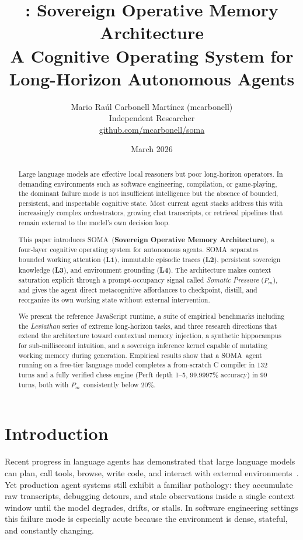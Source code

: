 \documentclass[11pt,a4paper]{article}
\title{\soma: Sovereign Operative Memory Architecture\\
\large A Cognitive Operating System for Long-Horizon Autonomous Agents}
\author{
Mario Ra\'{u}l Carbonell Mart\'{i}nez (mcarbonell)\\
\small Independent Researcher\\
\small \url{github.com/mcarbonell/soma}
}
\date{March 2026}
\newcommand{\soma}{\textsc{SOMA}}
\newcommand{\Pm}{\ensuremath{P_m}}
\begin{document}
\maketitle

\begin{abstract}
Large language models are effective local reasoners but poor long-horizon operators.
In demanding environments such as software engineering, compilation, or game-playing,
the dominant failure mode is not insufficient intelligence but the absence of bounded,
persistent, and inspectable cognitive state. Most current agent stacks address this
with increasingly complex orchestrators, growing chat transcripts, or retrieval
pipelines that remain external to the model's own decision loop.

This paper introduces \soma\ (\textbf{Sovereign Operative Memory Architecture}),
a four-layer cognitive operating system for autonomous agents.
\soma\ separates bounded working attention (\textbf{L1}), immutable episodic traces
(\textbf{L2}), persistent sovereign knowledge (\textbf{L3}), and environment
grounding (\textbf{L4}).
The architecture makes context saturation explicit through a prompt-occupancy
signal called \textit{Somatic Pressure} (\Pm), and gives the agent direct
metacognitive affordances to checkpoint, distill, and reorganize its own
working state without external intervention.

We present the reference JavaScript runtime, a suite of empirical benchmarks
including the \textit{Leviathan} series of extreme long-horizon tasks,
and three research directions that extend the architecture toward
contextual memory injection, a synthetic hippocampus for sub-millisecond
intuition, and a sovereign inference kernel capable of mutating working
memory during generation.
Empirical results show that a \soma\ agent running on a free-tier language
model completes a from-scratch C compiler in 132 turns and a fully verified
chess engine (Perft depth 1--5, 99.9997\% accuracy) in 99 turns,
both with \Pm\ consistently below 20\%.
\end{abstract}

\section{Introduction}

Recent progress in language agents has demonstrated that large language models
can plan, call tools, browse, write code, and interact with external
environments~\cite{yao2023react,wang2023voyager,sumers2023coala}.
Yet production agent systems still exhibit a familiar pathology: they accumulate
raw transcripts, debugging detours, and stale observations inside a single
context window until the model degrades, drifts, or stalls.
In software engineering settings this failure mode is especially acute because
the environment is dense, stateful, and constantly changing.
\end{document}
